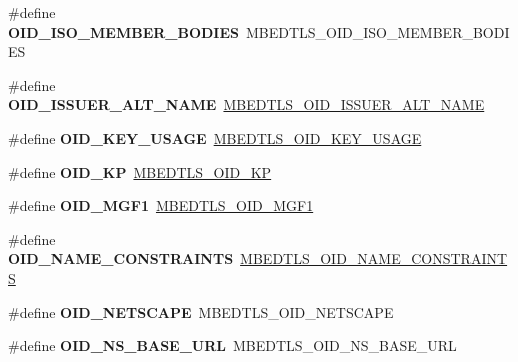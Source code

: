 \begin{DoxyCompactItemize}
\#define {\bfseries O\+I\+D\+\_\+\+I\+S\+O\+\_\+\+M\+E\+M\+B\+E\+R\+\_\+\+B\+O\+D\+I\+ES}~M\+B\+E\+D\+T\+L\+S\+\_\+\+O\+I\+D\+\_\+\+I\+S\+O\+\_\+\+M\+E\+M\+B\+E\+R\+\_\+\+B\+O\+D\+I\+ES
\item 
\mbox{\label{compat-1_83_8h_a0fa52faeca19b41e7f3319ce6106d050}} 
\#define {\bfseries O\+I\+D\+\_\+\+I\+S\+S\+U\+E\+R\+\_\+\+A\+L\+T\+\_\+\+N\+A\+ME}~\mbox{\hyperlink{oid_8h_aeea9acd528a40c3630b42d9ec4162ce4}{M\+B\+E\+D\+T\+L\+S\+\_\+\+O\+I\+D\+\_\+\+I\+S\+S\+U\+E\+R\+\_\+\+A\+L\+T\+\_\+\+N\+A\+ME}}
\item 
\mbox{\label{compat-1_83_8h_ac20f4cba8a0469b367cb95ae0e92c059}} 
\#define {\bfseries O\+I\+D\+\_\+\+K\+E\+Y\+\_\+\+U\+S\+A\+GE}~\mbox{\hyperlink{oid_8h_a6d7556c43f7fc4f3af5bbdfd26cb2620}{M\+B\+E\+D\+T\+L\+S\+\_\+\+O\+I\+D\+\_\+\+K\+E\+Y\+\_\+\+U\+S\+A\+GE}}
\item 
\mbox{\label{compat-1_83_8h_a07ee4653fa24c1791a7e03db0a4e622c}} 
\#define {\bfseries O\+I\+D\+\_\+\+KP}~\mbox{\hyperlink{oid_8h_a00f4d4d98ab235a1e3b5f3dcaf2e14f8}{M\+B\+E\+D\+T\+L\+S\+\_\+\+O\+I\+D\+\_\+\+KP}}
\item 
\mbox{\label{compat-1_83_8h_a034e20febccf741aee9978e5e2f9c7e1}} 
\#define {\bfseries O\+I\+D\+\_\+\+M\+G\+F1}~\mbox{\hyperlink{oid_8h_a41d20b2f31811636313feeafcd7959b9}{M\+B\+E\+D\+T\+L\+S\+\_\+\+O\+I\+D\+\_\+\+M\+G\+F1}}
\item 
\mbox{\label{compat-1_83_8h_a7c1e723effe9aeccb1e5184c963e99a5}} 
\#define {\bfseries O\+I\+D\+\_\+\+N\+A\+M\+E\+\_\+\+C\+O\+N\+S\+T\+R\+A\+I\+N\+TS}~\mbox{\hyperlink{oid_8h_acdfbc5ead965aaec5b1f82a575a8b2d2}{M\+B\+E\+D\+T\+L\+S\+\_\+\+O\+I\+D\+\_\+\+N\+A\+M\+E\+\_\+\+C\+O\+N\+S\+T\+R\+A\+I\+N\+TS}}
\item 
\mbox{\label{compat-1_83_8h_a8731e59179aae8c01c3b2d658869cc0c}} 
\#define {\bfseries O\+I\+D\+\_\+\+N\+E\+T\+S\+C\+A\+PE}~M\+B\+E\+D\+T\+L\+S\+\_\+\+O\+I\+D\+\_\+\+N\+E\+T\+S\+C\+A\+PE
\item 
\mbox{\label{compat-1_83_8h_aafda755a94c6ce20ed39e0afdc820d57}} 
\#define {\bfseries O\+I\+D\+\_\+\+N\+S\+\_\+\+B\+A\+S\+E\+\_\+\+U\+RL}~M\+B\+E\+D\+T\+L\+S\+\_\+\+O\+I\+D\+\_\+\+N\+S\+\_\+\+B\+A\+S\+E\+\_\+\+U\+RL

\end{DoxyCompactItemize}
